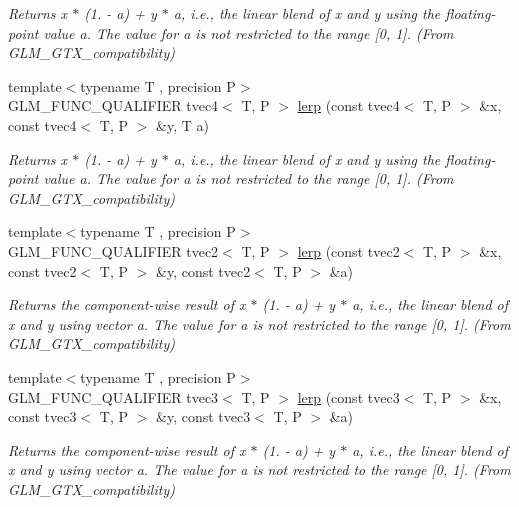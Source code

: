 \begin{DoxyCompactItemize}
\begin{DoxyCompactList}\small\item\em Returns x $\ast$ (1. -\/ a) + y $\ast$ a, i.\+e., the linear blend of x and y using the floating-\/point value a. The value for a is not restricted to the range \mbox{[}0, 1\mbox{]}. (From G\+L\+M\+\_\+\+G\+T\+X\+\_\+compatibility) \end{DoxyCompactList}\item 
{\footnotesize template$<$typename T , precision P$>$ }\\G\+L\+M\+\_\+\+F\+U\+N\+C\+\_\+\+Q\+U\+A\+L\+I\+F\+I\+E\+R tvec4$<$ T, P $>$ \hyperlink{group__gtx__compatibility_ga363d5d069d31a6c2cdd1e9589dde4a60}{lerp} (const tvec4$<$ T, P $>$ \&x, const tvec4$<$ T, P $>$ \&y, T a)
\begin{DoxyCompactList}\small\item\em Returns x $\ast$ (1. -\/ a) + y $\ast$ a, i.\+e., the linear blend of x and y using the floating-\/point value a. The value for a is not restricted to the range \mbox{[}0, 1\mbox{]}. (From G\+L\+M\+\_\+\+G\+T\+X\+\_\+compatibility) \end{DoxyCompactList}\item 
{\footnotesize template$<$typename T , precision P$>$ }\\G\+L\+M\+\_\+\+F\+U\+N\+C\+\_\+\+Q\+U\+A\+L\+I\+F\+I\+E\+R tvec2$<$ T, P $>$ \hyperlink{group__gtx__compatibility_ga7609b44d8aefc5a277efe73395ff4070}{lerp} (const tvec2$<$ T, P $>$ \&x, const tvec2$<$ T, P $>$ \&y, const tvec2$<$ T, P $>$ \&a)
\begin{DoxyCompactList}\small\item\em Returns the component-\/wise result of x $\ast$ (1. -\/ a) + y $\ast$ a, i.\+e., the linear blend of x and y using vector a. The value for a is not restricted to the range \mbox{[}0, 1\mbox{]}. (From G\+L\+M\+\_\+\+G\+T\+X\+\_\+compatibility) \end{DoxyCompactList}\item 
{\footnotesize template$<$typename T , precision P$>$ }\\G\+L\+M\+\_\+\+F\+U\+N\+C\+\_\+\+Q\+U\+A\+L\+I\+F\+I\+E\+R tvec3$<$ T, P $>$ \hyperlink{group__gtx__compatibility_ga90a1d1364a8d078846857178bdcc9af1}{lerp} (const tvec3$<$ T, P $>$ \&x, const tvec3$<$ T, P $>$ \&y, const tvec3$<$ T, P $>$ \&a)
\begin{DoxyCompactList}\small\item\em Returns the component-\/wise result of x $\ast$ (1. -\/ a) + y $\ast$ a, i.\+e., the linear blend of x and y using vector a. The value for a is not restricted to the range \mbox{[}0, 1\mbox{]}. (From G\+L\+M\+\_\+\+G\+T\+X\+\_\+compatibility) \end{DoxyCompactList}\item 

\end{DoxyCompactItemize}
